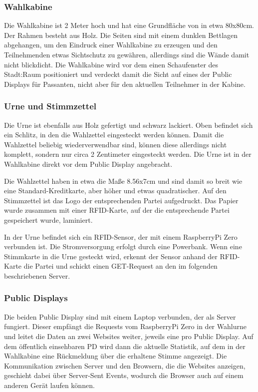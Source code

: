 \subsubsection{Wahlkabine}\label{wahlkabine}

Die Wahlkabine ist 2 Meter hoch und hat eine Grundfläche von in etwa 80x80cm.
Der Rahmen besteht aus Holz.
Die Seiten sind mit einem dunklen Bettlagen abgehangen, um den Eindruck einer Wahlkabine zu erzeugen und den Teilnehmenden etwas Sichtschutz zu gewähren, allerdings sind die Wände damit nicht blickdicht.
Die Wahlkabine wird vor dem einen Schaufenster des Stadt:Raum positioniert und verdeckt damit die Sicht auf eines der Public Displays für Passanten, nicht aber für den aktuellen Teilnehmer in der Kabine.

\subsubsection{Urne und Stimmzettel}\label{urne-und-stimmzettel}

Die Urne ist ebenfalls aus Holz gefertigt und schwarz lackiert. Oben befindet sich ein Schlitz, in den die Wahlzettel eingesteckt werden können.
Damit die Wahlzettel beliebig wiederverwendbar sind, können diese allerdings nicht komplett, sondern nur circa 2 Zentimeter eingesteckt werden.
Die Urne ist in der Wahlkabine direkt vor dem Public Display angebracht.

Die Wahlzettel haben in etwa die Maße 8.56x7cm und sind damit so breit wie eine Standard-Kreditkarte, aber höher und etwas quadratischer.
Auf den Stimmzettel ist das Logo der entsprechenden Partei aufgedruckt.
Das Papier wurde zusammen mit einer RFID-Karte, auf der die entsprechende Partei gespeichert wurde, laminiert.

In der Urne befindet sich ein RFID-Sensor, der mit einem RaspberryPi Zero verbunden ist.
Die Stromversorgung erfolgt durch eine Powerbank.
Wenn eine Stimmkarte in die Urne gesteckt wird, erkennt der Sensor anhand der RFID-Karte die Partei und schickt einen GET-Request an den im folgenden beschriebenen Server.

\subsubsection{Public Displays}\label{public-displays}

Die beiden Public Display sind mit einem Laptop verbunden, der als Server fungiert.
Dieser empfängt die Requests vom RaspberryPi Zero in der Wahlurne und leitet die Daten an zwei Websites weiter, jeweils eine pro Public Display.
Auf dem öffentlich einsehbaren PD wird dann die aktuelle Statistik, auf dem in der Wahlkabine eine Rückmeldung über die erhaltene Stimme angezeigt.
Die Kommunikation zwischen Server und den Browsern, die die Websites anzeigen, geschieht dabei über Server-Sent Events, wodurch die Browser auch auf einem anderen Gerät laufen können.

